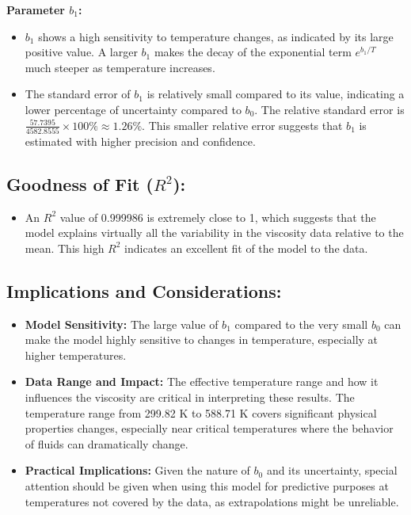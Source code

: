 \documentclass{article}
\begin{document}
\textbf{Parameter \(b_1\):}
\begin{itemize}
    \item \(b_1\) shows a high sensitivity to temperature changes, as indicated by its large positive value. A larger \(b_1\) makes the decay of the exponential term \(e^{b_1/T}\) much steeper as temperature increases.
    \item The standard error of \(b_1\) is relatively small compared to its value, indicating a lower percentage of uncertainty compared to \(b_0\). The relative standard error is \(\frac{57.7395}{4582.8555} \times 100\% \approx 1.26\%\). This smaller relative error suggests that \(b_1\) is estimated with higher precision and confidence.
\end{itemize}

\subsection*{Goodness of Fit (\(R^2\)):}
\begin{itemize}
    \item An \(R^2\) value of 0.999986 is extremely close to 1, which suggests that the model explains virtually all the variability in the viscosity data relative to the mean. This high \(R^2\) indicates an excellent fit of the model to the data.
\end{itemize}

\subsection*{Implications and Considerations:}
\begin{itemize}
    \item \textbf{Model Sensitivity:} The large value of \(b_1\) compared to the very small \(b_0\) can make the model highly sensitive to changes in temperature, especially at higher temperatures.
    \item \textbf{Data Range and Impact:} The effective temperature range and how it influences the viscosity are critical in interpreting these results. The temperature range from 299.82 K to 588.71 K covers significant physical properties changes, especially near critical temperatures where the behavior of fluids can dramatically change.
    \item \textbf{Practical Implications:} Given the nature of \(b_0\) and its uncertainty, special attention should be given when using this model for predictive purposes at temperatures not covered by the data, as extrapolations might be unreliable.
\end{itemize}
\end{document}
